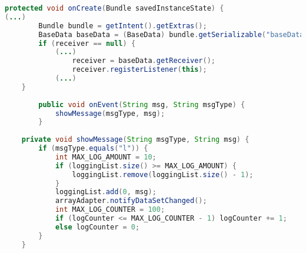 \label{appCode:klasseLogging}
\begin{lstlisting}[language=java, caption=Klasse Logging]
    protected void onCreate(Bundle savedInstanceState) {
(...)
        Bundle bundle = getIntent().getExtras();
        BaseData baseData = (BaseData) bundle.getSerializable("baseData");
        if (receiver == null) {
            (...)
                receiver = baseData.getReceiver();
                receiver.registerListener(this);
            (...)
    }
    
        public void onEvent(String msg, String msgType) {
            showMessage(msgType, msg);
        }
        
    private void showMessage(String msgType, String msg) {
        if (msgType.equals("l")) {
            int MAX_LOG_AMOUNT = 10;
            if (loggingList.size() >= MAX_LOG_AMOUNT) {
                loggingList.remove(loggingList.size() - 1);
            }
            loggingList.add(0, msg);
            arrayAdapter.notifyDataSetChanged();
            int MAX_LOG_COUNTER = 100;
            if (logCounter <= MAX_LOG_COUNTER - 1) logCounter += 1;
            else logCounter = 0;
        }
    }
\end{lstlisting}
